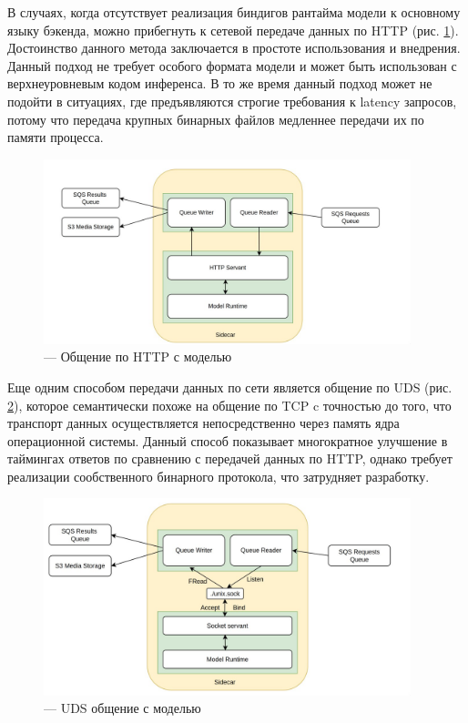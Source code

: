 В случаях, когда отсутствует реализация биндигов рантайма модели к основному языку бэкенда,
можно прибегнуть к сетевой передаче данных по HTTP (рис. \ref{fig:side2}). Достоинство данного метода
заключается в простоте использования и внедрения. Данный подход не требует особого формата модели и может
быть использован с верхнеуровневым кодом инференса. В то же время данный подход может не подойти
в ситуациях, где предъявляются строгие требования к latency запросов, потому что передача крупных
бинарных файлов медленнее передачи их по памяти процесса.

\begin{footnotesize}
\begin{figure}[H]
  \centering
  \includegraphics[width=0.95\textwidth]{img/side2.jpg}
  \caption{--- Общение по HTTP с моделью}
    \label{fig:side2}
\end{figure}
\end{footnotesize}

Еще одним способом передачи данных по сети является общение по UDS (рис. \ref{fig:side3}), которое семантически похоже
на общение по TCP c точностью до того, что транспорт данных осуществляется непосредственно через 
память ядра операционной системы. Данный способ показывает многократное улучшение в таймингах ответов
по сравнению с передачей данных по HTTP, однако требует реализации сообственного бинарного протокола, что 
затрудняет разработку.

\begin{footnotesize}
\begin{figure}[H]
  \centering
  \includegraphics[width=0.95\textwidth]{img/side3.jpg}
  \caption{--- UDS общение с моделью}
    \label{fig:side3}
\end{figure}
\end{footnotesize}

